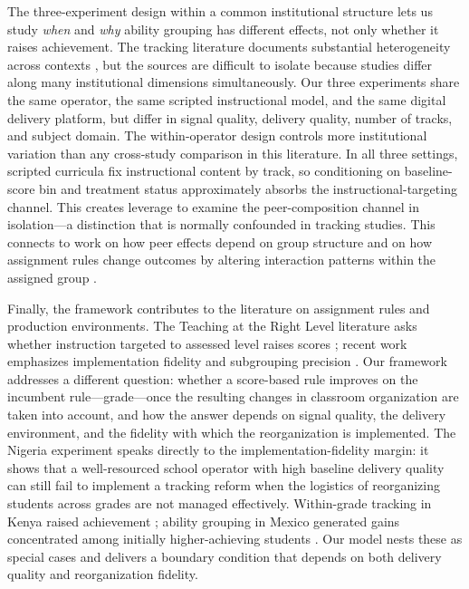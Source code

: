 \documentclass[11pt]{article}
\begin{document}
The three-experiment design within a common institutional structure lets us study \emph{when} and \emph{why} ability grouping has different effects, not only whether it raises achievement. The tracking literature documents substantial heterogeneity across contexts \citep{betts:2011,card2016can,vardardottir2013peer}, but the sources are difficult to isolate because studies differ along many institutional dimensions simultaneously. Our three experiments share the same operator, the same scripted instructional model, and the same digital delivery platform, but differ in signal quality, delivery quality, number of tracks, and subject domain. The within-operator design controls more institutional variation than any cross-study comparison in this literature. In all three settings, scripted curricula fix instructional content by track, so conditioning on baseline-score bin and treatment status approximately absorbs the instructional-targeting channel. This creates leverage to examine the peer-composition channel in isolation---a distinction that is normally confounded in tracking studies. This connects to work on how peer effects depend on group structure \citep{hoxby2005taking,rjosk2022dispersion,vigdor2007peer} and on how assignment rules change outcomes by altering interaction patterns within the assigned group \citep{carrellsacerdotewest2013,garlick}.

Finally, the framework contributes to the literature on assignment rules and production environments. The Teaching at the Right Level literature asks whether instruction targeted to assessed level raises scores \citep{banerjee2017proof,duflo2020experimental}; recent work emphasizes implementation fidelity and subgrouping precision \citep{angristmeager2023}. Our framework addresses a different question: whether a score-based rule improves on the incumbent rule---grade---once the resulting changes in classroom organization are taken into account, and how the answer depends on signal quality, the delivery environment, and the fidelity with which the reorganization is implemented. The Nigeria experiment speaks directly to the implementation-fidelity margin: it shows that a well-resourced school operator with high baseline delivery quality can still fail to implement a tracking reform when the logistics of reorganizing students across grades are not managed effectively. Within-grade tracking in Kenya raised achievement \citep{duflo2011peer}; ability grouping in Mexico generated gains concentrated among initially higher-achieving students \citep{bussofrisancho2023}. Our model nests these as special cases and delivers a boundary condition that depends on both delivery quality and reorganization fidelity.
\end{document}
